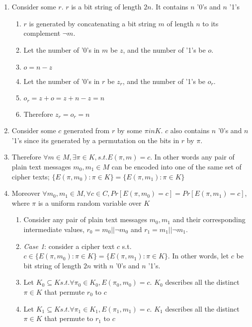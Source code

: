 \documentclass[]{article}
\begin{document}
\section{}
\begin{enumerate}
	\item Consider some $r$. $r$ is a bit string of length $2n$. It contains $n$ '0's and $n$ '1's
	\begin{enumerate}
		\item $r$ is generated by concatenating a bit string $m$ of length $n$ to its complement $\lnot m$.
		\item Let the number of '0's in $m$  be $z$, and the number of '1's be $o$.
		\item $o = n - z$
		\item Let the number of '0's in $r$  be $z_r$, and the number of '1's be $o_r$.
		\item $o_r = z + o = z + n - z = n$
		\item Therefore $z_r = o_r = n$
	\end{enumerate}
	\item Consider some $c$ generated from $r$ by some $\pi in K$. $c$ also contains $n$ '0's and $n$ '1's since its generated by a permutation on the bits in $r$ by $\pi$.
	\item Therefore $\forall m \in M, \exists \pi \in K, s.t. E(\pi, m) = c$. In other words any pair of plain text messages $m_0, m_1 \in M$ can be encoded into one of the same set of cipher texts; $\{E(\pi, m_0): \pi \in K\} = \{E(\pi, m_1): \pi \in K\}$
	\item Moreover $\forall m_0, m_1 \in M, \forall c \in C, Pr[E(\pi, m_0) = c] = Pr[E(\pi, m_1) = c]$, where $\pi$ is a uniform random variable over $K$
	\begin{enumerate}
		\item Consider any pair of plain text messages $m_0, m_1$ and their corresponding intermediate values, $r_0 = m_0 || \lnot m_0 $ and  $r_1 = m_1 || \lnot m_1 $. 
		\item \textit{Case 1}: consider a cipher text $c$ s.t. $c \in \{E(\pi, m_0): \pi \in K\} = \{E(\pi, m_1): \pi \in K\}$. In other words, let $c$ be bit string of length $2n$ with $n$ '0's and $n$ '1's.
		\item Let $K_0 \subseteq K s.t. \forall \pi_0 \in K_0, E(\pi_0, m_0) = c$. $K_0$ describes all the distinct $\pi \in K$ that permute $r_0$ to $c$
		\item Let $K_1 \subseteq K s.t. \forall \pi_1 \in K_1, E(\pi_1, m_1) = c$. $K_1$ describes all the distinct $\pi \in K$ that permute to $r_1$ to $c$

\end{enumerate}
\end{enumerate}
\end{document}
